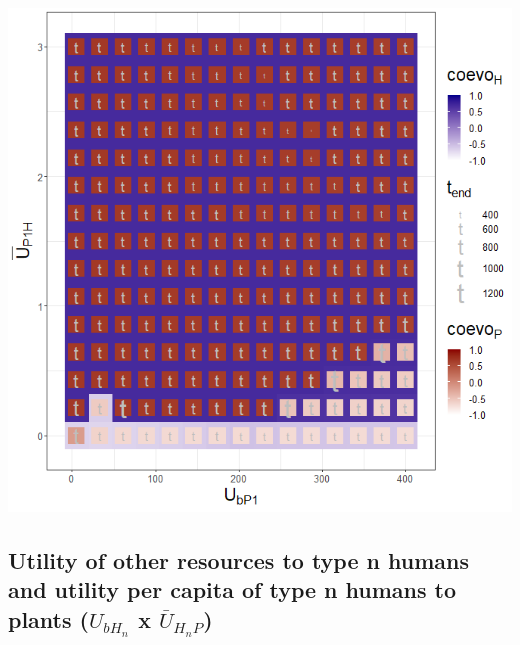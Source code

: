 \documentclass[
]{book}
\begin{document}
\includegraphics[width=1\linewidth]{plots/3_twoPar-U.bP1-mU.P1H_plot}

\newpage

\hypertarget{utility-of-other-resources-to-type-n-humans-and-utility-per-capita-of-type-n-humans-to-plants-u_bh_n-x-baru_h_np}{%
\subsection{\texorpdfstring{Utility of other resources to type n humans and utility per capita of type n humans to plants (\(U_{bH_{n}}\) x \(\bar{U}_{H_{n}P}\))}{Utility of other resources to type n humans and utility per capita of type n humans to plants (U\_\{bH\_\{n\}\} x \textbackslash bar\{U\}\_\{H\_\{n\}P\})}}\label{utility-of-other-resources-to-type-n-humans-and-utility-per-capita-of-type-n-humans-to-plants-u_bh_n-x-baru_h_np}}
\end{document}
